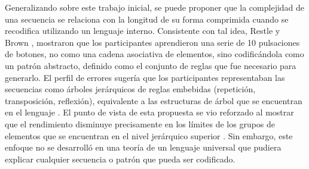 
Generalizando sobre este trabajo inicial, se puede proponer que la complejidad de una secuencia se relaciona con la longitud de su forma comprimida cuando se recodifica utilizando un lenguaje interno. Consistente con tal idea, Restle y Brown \cite{f36}, mostraron que los participantes aprendieron una serie de 10 pulsaciones de botones, no como una cadena asociativa de elementos, sino codificándola como un patrón abstracto, definido como el conjunto de reglas que fue necesario para generarlo. El perfil de errores sugería que los participantes representaban las secuencias como árboles jerárquicos de reglas embebidas (repetición, transposición, reflexión), equivalente a las estructuras de árbol que se encuentran en el lenguaje \cite{f37}. El punto de vista de esta propuesta se vio reforzado al mostrar que el rendimiento disminuye precisamente en los límites de los grupos de elementos que se encuentran en el nivel jerárquico superior \cite{f36,f37,f38}. Sin embargo, este enfoque no se desarrolló en una teoría de un lenguaje universal que pudiera explicar cualquier secuencia o patrón que pueda ser codificado.

